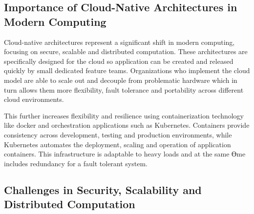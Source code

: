 \subsection{Importance of Cloud-Native Architectures in Modern Computing}

Cloud-native architectures represent a significant shift in modern computing, focusing on secure, scalable and distributed computation. These architectures are specifically designed for the cloud so application can be created and released quickly by small dedicated feature teams. Organizations who implement the cloud model are able to scale out and decouple from problematic hardware which in turn allows them more flexibility, fault tolerance and portability across different cloud environments. \cite{r2}

This further increases flexibility and resilience using containerization technology like docker and orchestration applications such as Kubernetes. Containers provide consistency across development, testing and production environments, while Kubernetes automates the deployment, scaling and operation of application containers. This infrastructure is adaptable to heavy loads and at the same Ɵme includes redundancy for a fault tolerant system. \cite{r4}



\subsection{Challenges in Security, Scalability and Distributed Computation}

